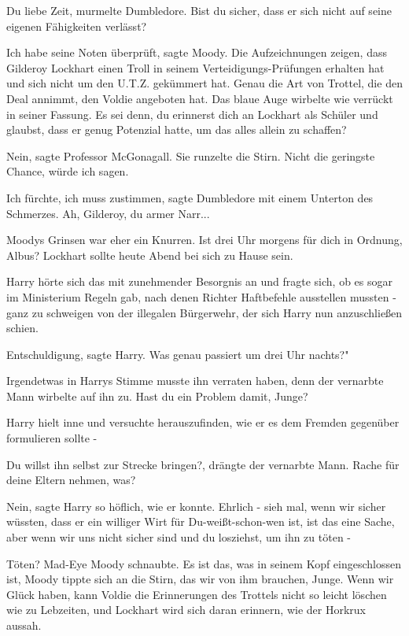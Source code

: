 \glqq Du liebe Zeit\grqq{}, murmelte Dumbledore. \glqq Bist du sicher, dass er
sich nicht auf seine eigenen Fähigkeiten verlässt?\grqq{}

\glqq Ich habe seine Noten überprüft\grqq{}, sagte Moody. \glqq Die
Aufzeichnungen zeigen, dass Gilderoy Lockhart einen Troll in seinem
Verteidigungs-Prüfungen erhalten hat und sich nicht um den U.T.Z. gekümmert hat.
Genau die Art von Trottel, die den Deal annimmt, den Voldie angeboten
hat.\grqq{} Das blaue Auge wirbelte wie verrückt in seiner Fassung. \glqq Es sei
denn, du erinnerst dich an Lockhart als Schüler und glaubst, dass er genug
Potenzial hatte, um das alles allein zu schaffen?\grqq{}

\glqq Nein\grqq{}, sagte Professor McGonagall. Sie runzelte die Stirn. \glqq
Nicht die geringste Chance, würde ich sagen.\grqq{}

\glqq Ich fürchte, ich muss zustimmen\grqq{}, sagte Dumbledore mit einem
Unterton des Schmerzes. \glqq Ah, Gilderoy, du armer Narr...\grqq{}

Moodys Grinsen war eher ein Knurren. \glqq Ist drei Uhr morgens für dich in
Ordnung, Albus? Lockhart sollte heute Abend bei sich zu Hause sein.\grqq{}

Harry hörte sich das mit zunehmender Besorgnis an und fragte sich, ob es sogar
im Ministerium Regeln gab, nach denen Richter Haftbefehle ausstellen mussten -
ganz zu schweigen von der illegalen Bürgerwehr, der sich Harry nun anzuschließen
schien.

\glqq Entschuldigung\grqq{}, sagte Harry. \glqq Was genau passiert um drei Uhr
nachts?"

Irgendetwas in Harrys Stimme musste ihn verraten haben, denn der vernarbte Mann
wirbelte auf ihn zu. \glqq Hast du ein Problem damit, Junge?\grqq{}

Harry hielt inne und versuchte herauszufinden, wie er es dem Fremden gegenüber
formulieren sollte -

\glqq Du willst ihn selbst zur Strecke bringen?\grqq{}, drängte der vernarbte
Mann. \glqq Rache für deine Eltern nehmen, was?\grqq{}

\glqq Nein\grqq{}, sagte Harry so höflich, wie er konnte. \glqq Ehrlich - sieh
mal, wenn wir sicher wüssten, dass er ein williger Wirt für Du-weißt-schon-wen
ist, ist das eine Sache, aber wenn wir uns nicht sicher sind und du losziehst,
um ihn zu töten -\grqq{}

\glqq Töten?\grqq{} Mad-Eye Moody schnaubte. \glqq Es ist das, was in seinem
Kopf eingeschlossen ist\grqq{}, Moody tippte sich an die Stirn, \glqq das wir
von ihm brauchen, Junge. Wenn wir Glück haben, kann Voldie die Erinnerungen des
Trottels nicht so leicht löschen wie zu Lebzeiten, und Lockhart wird sich daran
erinnern, wie der Horkrux aussah.\grqq{}

